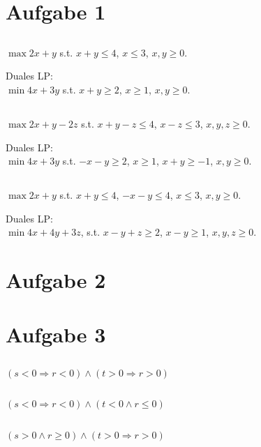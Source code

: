 \documentclass[a4paper]{article}
\begin{document}
\section{Aufgabe 1}
\subsection{}
$\max 2x+y$ s.t. $x+y \leq 4$, $x \leq 3$, $x,y \geq 0$.

Duales LP: \\
$\min 4x+3y$ s.t. $x+y \geq 2$, $x \geq 1$, $x,y \geq 0$.

\subsection{}
$\max 2x+y-2z$ s.t. $x+y-z \leq 4$, $x-z \leq 3$, $x,y,z \geq 0$.

Duales LP: \\
$\min 4x+3y$ s.t. $-x-y \geq 2$, $x \geq 1$, $x+y \geq -1$, $x,y \geq 0$.

\subsection{}
$\max 2x+y$ s.t. $x+y \leq 4$, $-x-y \leq 4$, $x \leq 3$, $x,y \geq 0$.

Duales LP: \\
$\min 4x+4y+3z$, s.t. $x-y+z \geq 2$, $x-y \geq 1$, $x,y,z \geq 0$.

\section{Aufgabe 2}

\section{Aufgabe 3}
\subsection{}
$(s < 0 \Rightarrow r < 0) \wedge (t > 0 \Rightarrow r > 0)$
\subsection{}
$(s < 0 \Rightarrow r < 0) \wedge (t < 0 \wedge r \leq 0)$
\subsection{}
$(s > 0 \wedge r \geq 0) \wedge (t > 0 \Rightarrow r > 0)$
\end{document}
